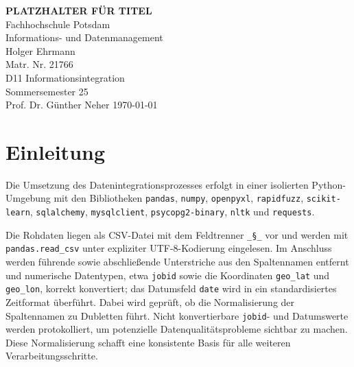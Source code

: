 \documentclass[
    a4paper,
    12pt,
    headinclude=true,
    BCOR=10mm,
]{scrreprt}
\begin{document}
\begin{titlepage}
    \centering
    \vspace*{1cm}
    \Large{\textbf{PLATZHALTER FÜR TITEL}}\\
    \vspace{1.5cm}
    \Large{Fachhochschule Potsdam}\\
    \vspace{0.5cm}
    \large{Informations- und Datenmanagement}\\
    \vspace{1.5cm}
    Holger Ehrmann\\
    Matr. Nr. 21766\\
    \vspace{1cm}
    D11 Informationsintegration\\
    Sommersemester 25\\
    Prof. Dr. Günther Neher
    \vfill
    \today
\end{titlepage}
\setcounter{tocdepth}{1}
\begingroup
{} %
{\small \tableofcontents}
\endgroup

\chapter{Einleitung}

Die Umsetzung des Datenintegrationsprozesses erfolgt in einer isolierten Python-Umgebung mit den Bibliotheken \texttt{pandas}, \texttt{numpy}, \texttt{openpyxl}, \texttt{rapidfuzz}, \texttt{scikit-learn}, \texttt{sqlalchemy}, \texttt{mysqlclient}, \texttt{psycopg2-binary}, \texttt{nltk} und \texttt{requests}.

Die Rohdaten liegen als CSV-Datei mit dem Feldtrenner \texttt{\_§\_} vor und werden mit \texttt{pandas.read\_csv} unter expliziter UTF-8-Kodierung eingelesen. Im Anschluss werden führende sowie abschließende Unterstriche aus den Spaltennamen entfernt und numerische Datentypen, etwa \texttt{jobid} sowie die Koordinaten \texttt{geo\_lat} und \texttt{geo\_lon}, korrekt konvertiert; das Datumsfeld \texttt{date} wird in ein standardisiertes Zeitformat überführt. Dabei wird geprüft, ob die Normalisierung der Spaltennamen zu Dubletten führt. Nicht konvertierbare \texttt{jobid}- und Datumswerte werden protokolliert, um potenzielle Datenqualitätsprobleme sichtbar zu machen. Diese Normalisierung schafft eine konsistente Basis für alle weiteren Verarbeitungsschritte.
\end{document}
